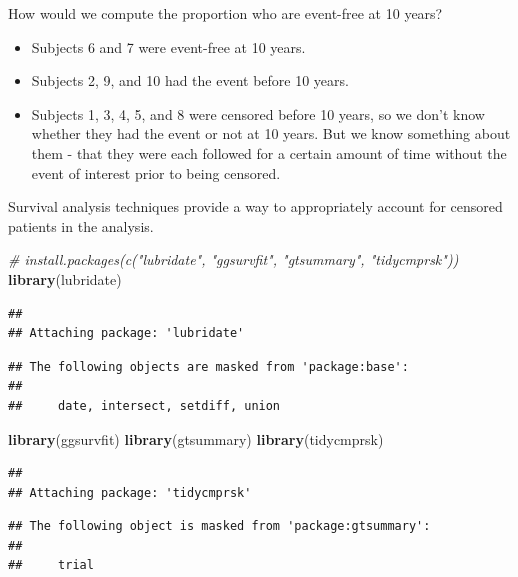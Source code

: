 \documentclass[
]{book}
\newenvironment{Shaded}{\begin{snugshade}}{\end{snugshade}}
\newcommand{\CommentTok}[1]{\textcolor[rgb]{0.56,0.35,0.01}{\textit{#1}}}
\newcommand{\FunctionTok}[1]{\textcolor[rgb]{0.13,0.29,0.53}{\textbf{#1}}}
\newcommand{\NormalTok}[1]{#1}
\providecommand{\tightlist}{%
  \setlength{\itemsep}{0pt}\setlength{\parskip}{0pt}}
\begin{document}
How would we compute the proportion who are event-free at 10 years?

\begin{itemize}
\tightlist
\item
  Subjects 6 and 7 were event-free at 10 years.
\item
  Subjects 2, 9, and 10 had the event before 10 years.
\item
  Subjects 1, 3, 4, 5, and 8 were censored before 10 years, so we don't know whether they had the event or not at 10 years. But we know something about them - that they were each followed for a certain amount of time without the event of interest prior to being censored.
\end{itemize}

Survival analysis techniques provide a way to appropriately account for censored patients in the analysis.

\begin{Shaded}
\begin{Highlighting}[]
\CommentTok{\# install.packages(c("lubridate", "ggsurvfit", "gtsummary", "tidycmprsk"))}
\FunctionTok{library}\NormalTok{(lubridate)}
\end{Highlighting}
\end{Shaded}

\begin{verbatim}
## 
## Attaching package: 'lubridate'
\end{verbatim}

\begin{verbatim}
## The following objects are masked from 'package:base':
## 
##     date, intersect, setdiff, union
\end{verbatim}

\begin{Shaded}
\begin{Highlighting}[]
\FunctionTok{library}\NormalTok{(ggsurvfit)}
\FunctionTok{library}\NormalTok{(gtsummary)}
\FunctionTok{library}\NormalTok{(tidycmprsk)}
\end{Highlighting}
\end{Shaded}

\begin{verbatim}
## 
## Attaching package: 'tidycmprsk'
\end{verbatim}

\begin{verbatim}
## The following object is masked from 'package:gtsummary':
## 
##     trial
\end{verbatim}
\end{document}
